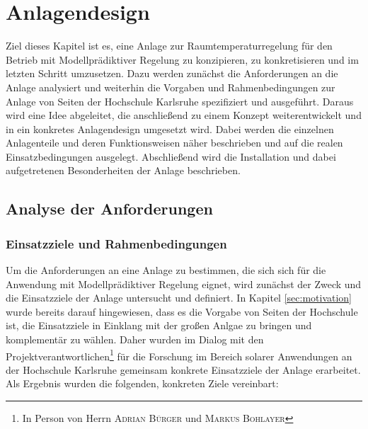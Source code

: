 %
%

\renewcommand{\chapterheadstartvskip}{\vspace*{2cm}}

\chapter{Anlagendesign}
\label{chap:anlagendesign}

\renewcommand{\chapterheadstartvskip}{\vspace*{-0.5cm}}

Ziel dieses Kapitel ist es, eine Anlage zur Raumtemperaturregelung für den Betrieb mit Modellprädiktiver Regelung zu konzipieren, zu konkretisieren und im letzten Schritt umzusetzen. Dazu werden zunächst die Anforderungen an die Anlage analysiert und weiterhin die Vorgaben und Rahmenbedingungen zur Anlage von Seiten der Hochschule Karlsruhe spezifiziert und ausgeführt. Daraus wird eine Idee abgeleitet, die anschließend zu einem Konzept weiterentwickelt und in ein konkretes Anlagendesign umgesetzt wird. Dabei werden die einzelnen Anlagenteile und deren Funktionsweisen näher beschrieben und auf die realen Einsatzbedingungen ausgelegt. Abschließend wird die Installation und dabei aufgetretenen Besonderheiten der Anlage beschrieben.

\section{Analyse der Anforderungen}
\label{sec:anforderungen}

\subsection{Einsatzziele und Rahmenbedingungen}
Um die Anforderungen an eine Anlage zu bestimmen, die sich sich für die Anwendung mit Modellprädiktiver Regelung eignet, wird zunächst der Zweck und die Einsatzziele der Anlage untersucht und definiert. In Kapitel \ref{sec:motivation} wurde bereits darauf hingewiesen, dass es die Vorgabe von Seiten der Hochschule ist, die Einsatzziele in Einklang mit der großen Anlgae zu bringen und komplementär zu wählen. Daher wurden im Dialog mit den Projektverantwortlichen\footnote{In Person von Herrn \textsc{Adrian Bürger} und \textsc{Markus Bohlayer}} für die Forschung im Bereich solarer Anwendungen an der Hochschule Karlsruhe gemeinsam konkrete Einsatzziele der Anlage erarbeitet. Als Ergebnis wurden die folgenden, konkreten Ziele vereinbart:
 
